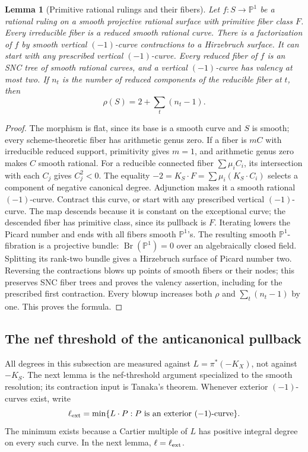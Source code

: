 \documentclass[11pt,reqno]{amsart}
\newtheorem{lemma}[lemma]{Lemma}
\theoremstyle{definition}
\theoremstyle{remark}
\newcommand{\PP}{\mathbb P}
\numberwithin{equation}{section}
\begin{document}
\begin{lemma}[Primitive rational rulings and their fibers]
\label{lem:ruling-fibers}
Let $f:S\to\PP^1$ be a rational ruling on a smooth projective rational
surface with primitive fiber class $F$.
Every irreducible fiber is a reduced smooth rational curve.
There is a factorization of $f$ by smooth vertical $(-1)$-curve
contractions to a Hirzebruch surface. It can start with any prescribed
vertical $(-1)$-curve. Every reduced fiber of $f$ is an SNC tree of
smooth rational curves, and a vertical $(-1)$-curve has valency at most
two. If $n_t$ is the number of reduced components of the reducible fiber
at $t$, then
\begin{equation}\label{eq:primitive-ruling-relative-picard}
 \rho(S)=2+\sum_t(n_t-1).
\end{equation}
\end{lemma}

\begin{proof}
The morphism is flat, since its base is a smooth curve and $S$ is
smooth; every scheme-theoretic fiber has arithmetic genus zero.
If a fiber is $mC$ with irreducible reduced support, primitivity gives
$m=1$, and arithmetic genus zero makes $C$ smooth rational.
For a reducible connected fiber $\sum\mu_iC_i$, its intersection
with each $C_j$ gives $C_j^2<0$. The equality
$-2=K_S\cdot F=\sum\mu_i(K_S\cdot C_i)$ selects a component of
negative canonical degree. Adjunction makes it a smooth rational
$(-1)$-curve.
Contract this curve, or start with any prescribed vertical $(-1)$-curve.
The map descends because it is constant on the exceptional curve;
the descended fiber has primitive class, since its pullback is $F$.
Iterating lowers the Picard number and ends with all fibers smooth
$\PP^1$'s. The resulting smooth $\PP^1$-fibration is a projective bundle:
$\operatorname{Br}(\PP^1)=0$ over an algebraically closed field.
Splitting its rank-two bundle gives a Hirzebruch surface of Picard
number two. Reversing the contractions blows up points of smooth
fibers or their nodes; this preserves SNC fiber trees and proves the
valency assertion, including for the prescribed first contraction.
Every blowup increases both $\rho$ and $\sum_t(n_t-1)$ by one.
This proves the formula.
\end{proof}

\subsection{The nef threshold of the anticanonical pullback}
All degrees in this subsection are measured against
$L=\pi^*(-K_X)$, not against $-K_S$. The next lemma is the
nef-threshold argument specialized to the smooth resolution; its
contraction input is Tanaka's theorem.
Whenever exterior $(-1)$-curves exist, write
\[
 \ell_{\rm ext}=\min\{L\cdot P:P\text{ is an exterior }(-1)\text{-curve}\}.
\]
The minimum exists because a Cartier multiple of $L$ has positive
integral degree on every such curve. In the next lemma, $\ell=\ell_{\rm ext}$.
\end{document}
